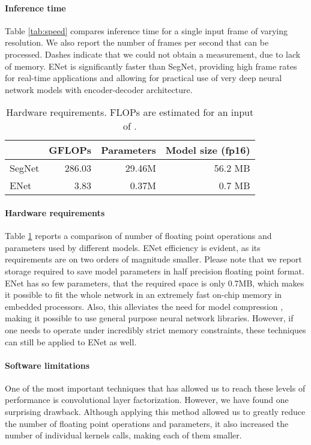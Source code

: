 \documentclass{article}
\begin{document}
\paragraph{Inference time} Table \ref{tab:speed} compares inference time for a single input frame of varying resolution. We also report the number of frames per second that can be processed.
Dashes indicate that we could not obtain a measurement, due to lack of memory.
ENet is significantly faster than SegNet, providing high frame rates for real-time applications and allowing for practical use of very deep neural network models with encoder-decoder architecture.

\begin{table}[htb]
  \caption{Hardware requirements. FLOPs are estimated for an input of .}
  \vspace{0.05in}
  \label{tab:ops}
  \centering
  \begin{tabular}{ l r r r }
    \toprule
    &\multicolumn{1}{c}{GFLOPs} &\multicolumn{1}{c}{Parameters} & \multicolumn{1}{c}{Model size (fp16)}\\
    \midrule
    SegNet      &286.03                    &29.46M             & 56.2 MB\\
    ENet        &3.83                      &0.37M              & 0.7 MB\\
    \bottomrule
  \end{tabular}
\end{table}

\paragraph{Hardware requirements} Table \ref{tab:ops} reports a comparison of number of floating point operations and parameters used by different models.
ENet efficiency is evident, as its requirements are on two orders of magnitude smaller.
Please note that we report storage required to save model parameters in half precision floating point format.
ENet has so few parameters, that the required space is only 0.7MB, which makes it possible to fit the whole network in an extremely fast on-chip memory in embedded processors.
Also, this alleviates the need for model compression \cite{song15}, making it possible to use general purpose neural network libraries.
However, if one needs to operate under incredibly strict memory constraints, these techniques can still be applied to ENet as well.

\paragraph{Software limitations} One of the most important techniques that has allowed us to reach these levels of performance is convolutional layer factorization.
However, we have found one surprising drawback.
Although applying this method allowed us to greatly reduce the number of floating point operations and parameters, it also increased the number of individual kernels calls, making each of them smaller.
\end{document}
